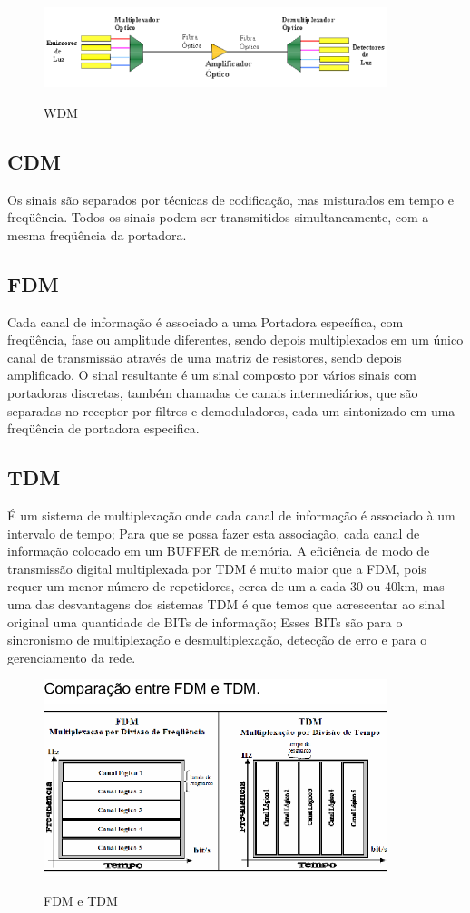 \documentclass{article}
\begin{document}
\begin{figure}[h]
    \center
    \includegraphics[width=10cm]{imagens/wdm.png}
    \label{wdm}
    \caption{WDM}
\end{figure}

\subsection{CDM}
Os sinais são separados por técnicas de codificação, mas misturados em
tempo e freqüência. Todos os sinais podem ser transmitidos simultaneamente, com
a mesma freqüência da portadora. 

\subsection{FDM}
Cada canal de informação é associado a uma Portadora específica, com freqüência,
fase ou amplitude diferentes, sendo depois multiplexados em um único canal de
transmissão através de uma matriz de  resistores, sendo depois amplificado. O
sinal resultante é um sinal composto por vários sinais com portadoras discretas,
também chamadas de canais intermediários, que são separadas no receptor por
filtros e demoduladores, cada um sintonizado em uma freqüência de portadora
especifica.

\subsection{TDM} É um sistema de multiplexação onde cada canal de informação é
associado à um intervalo de tempo; Para que se possa fazer esta associação, cada
canal de informação colocado em um BUFFER de memória. A eficiência de modo de
transmissão digital multiplexada por TDM é muito maior que a FDM, pois requer um
menor número de repetidores, cerca de um a cada 30 ou 40km, mas uma das
desvantagens dos sistemas TDM é que temos que acrescentar ao sinal original uma
quantidade de BITs de informação; Esses BITs são para o sincronismo de
multiplexação e desmultiplexação, detecção de erro e para o gerenciamento da
rede.

\begin{figure}[h]
    \center
    \includegraphics[width=10cm]{imagens/fdmtdm.png}
    \label{fdmtdm}
    \caption{FDM e TDM}
\end{figure}
\end{document}
